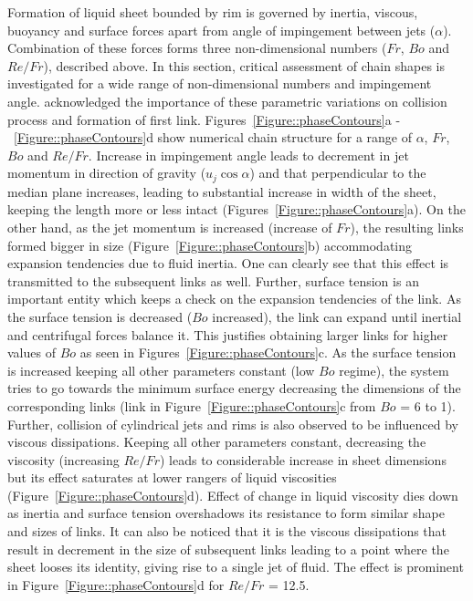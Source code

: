 \documentclass{jfm}
\begin{document}
Formation of liquid sheet bounded by rim is governed by inertia, viscous, buoyancy and surface forces apart from angle of impingement between jets ($\alpha$). Combination of these forces forms three non-dimensional numbers ($Fr$, $Bo$ and $Re/Fr$), described above. In this section, critical assessment of chain shapes is investigated for a wide range of non-dimensional numbers and impingement angle. \cite{yang2014liquid} acknowledged the importance of these parametric variations on collision process and formation of first link. Figures~\ref{Figure::phaseContours}a -~\ref{Figure::phaseContours}d show numerical chain structure for a range of $\alpha$, $Fr$, $Bo$ and $Re/Fr$. Increase in impingement angle leads to decrement in jet momentum in direction of gravity ($u_j\cos\alpha$) and that perpendicular to the median plane increases, leading to substantial increase in width of the sheet, keeping the length more or less intact (Figures~\ref{Figure::phaseContours}a). On the other hand, as the jet momentum is increased (increase of $Fr$), the resulting links formed bigger in size (Figure~\ref{Figure::phaseContours}b) accommodating expansion tendencies due to fluid inertia. One can clearly see that this effect is transmitted to the subsequent links as well. Further, surface tension is an important entity which keeps a check on the expansion tendencies of the link. As the surface tension is decreased ($Bo$ increased), the link can expand until inertial and centrifugal forces balance it. This justifies obtaining larger links for higher values of $Bo$ as seen in Figures~\ref{Figure::phaseContours}c. As the surface tension is increased keeping all other parameters constant (low $Bo$ regime), the system tries to go towards the minimum surface energy decreasing the dimensions of the corresponding links (link in Figure~\ref{Figure::phaseContours}c from $Bo$ = 6 to 1). Further, collision of cylindrical jets and rims is also observed to be influenced by viscous dissipations. Keeping all other parameters constant, decreasing the viscosity (increasing $Re/Fr$) leads to considerable increase in sheet dimensions but its effect saturates at lower rangers of liquid viscosities (Figure~\ref{Figure::phaseContours}d). Effect of change in liquid viscosity dies down as inertia and surface tension overshadows its resistance to form similar shape and sizes of links. It can also be noticed that it is the viscous dissipations that result in decrement in the size of subsequent links leading to a point where the sheet looses its identity, giving rise to a single jet of fluid. The effect is prominent in Figure~\ref{Figure::phaseContours}d for $Re/Fr$ = 12.5. 
\end{document}
